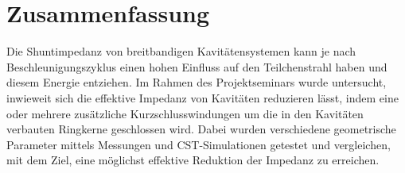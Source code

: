 \chapter*{Zusammenfassung}
Die Shuntimpedanz von breitbandigen Kavitätensystemen kann je nach Beschleunigungszyklus einen hohen Einfluss auf den Teilchenstrahl haben und diesem Energie entziehen. Im Rahmen des Projektseminars wurde untersucht, inwieweit sich die effektive Impedanz von Kavitäten reduzieren lässt, indem eine oder mehrere zusätzliche Kurzschlusswindungen um die in den Kavitäten verbauten Ringkerne geschlossen wird. Dabei wurden verschiedene geometrische Parameter mittels Messungen und CST-Simulationen getestet und vergleichen, mit dem Ziel, eine möglichst effektive Reduktion der Impedanz zu erreichen. 